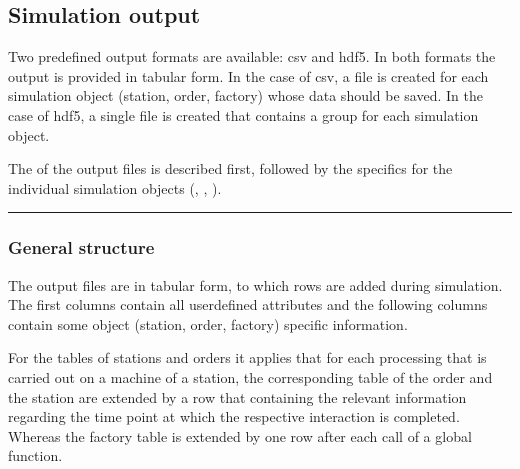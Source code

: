 \documentclass[letterpaper,10pt,english]{sphinxmanual}
\begin{document}
\subsection{Simulation output}
\label{\detokenize{source/Interface_files/output_file:simulation-output}}\label{\detokenize{source/Interface_files/output_file:output-file}}\label{\detokenize{source/Interface_files/output_file::doc}}
\sphinxAtStartPar
Two predefined output formats are available: csv and hdf5. In both formats the output is provided in tabular form. In
the case of csv, a file is created for each simulation object (station, order, factory) whose data should be saved. In
the case of hdf5, a single file is created that contains a group for each simulation object.

\sphinxAtStartPar
The {\hyperref[\detokenize{source/Interface_files/output_file:general-structure}]{}} of the output files is described first, followed by the specifics for
the individual simulation objects ({\hyperref[\detokenize{source/Interface_files/output_file:output-station}]{}}, {\hyperref[\detokenize{source/Interface_files/output_file:output-order}]{}},
{\hyperref[\detokenize{source/Interface_files/output_file:output-factory}]{}}).


\bigskip\hrule\bigskip



\subsubsection{General structure}
\label{\detokenize{source/Interface_files/output_file:general-structure}}\label{\detokenize{source/Interface_files/output_file:id1}}
\sphinxAtStartPar
The output files are in tabular form, to which rows are added during simulation. The first columns contain all
user\sphinxhyphen{}defined attributes and the following columns contain some object (station, order, factory) specific information.

\sphinxAtStartPar
For the tables of stations and orders it applies that for each processing that is carried out on a machine of a
station, the corresponding table of the order and the station are extended by a row that containing the relevant
information regarding the time point at which the respective interaction is completed. Whereas the factory table is
extended by one row after each call of a global function.
\end{document}
